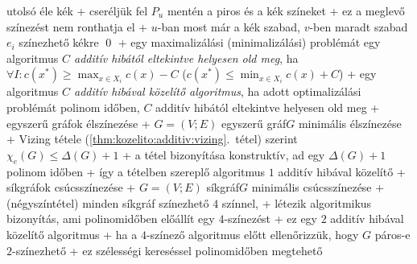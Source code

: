         utolsó éle kék
    + cseréljük fel $P_u$ mentén a piros és a kék színeket
      + ez a meglevő színezést nem ronthatja el
      + $u$-ban most már a kék szabad, $v$-ben maradt szabad \RA%
        $e_i$ színezhető kékre \qed
+ \dfn egy maximalizálási (minimalizálási) problémát egy algoritmus
  \emph{$C$ additív hibától eltekintve helyesen old meg}, ha $\forall I:
  c(x^*) \ge \max_{x \in X_i} c(x) - C$ ($c(x^*) \le \min_{x \in X_i}
  c(x) + C$)
+ \dfn egy algoritmus \emph{$C$ additív hibával közelítő algoritmus},
  ha adott optimalizálási problémát polinom időben, $C$ additív
  hibától eltekintve helyesen old meg
+ \prob egyszerű gráfok élszínezése
  + \DataIn $G = (V; E)$ egyszerű gráf\qquad\DataOut $G$
    minimális élszínezése
  + Vizing tétele (\ref{thm:kozelito:additiv:vizing}.~tétel) szerint
    $\chi_e(G) \le \Delta(G) + 1$
    + a tétel bizonyítása konstruktív, ad egy $\Delta(G) + 1$ polinom
      időben
    + így a tételben szereplő algoritmus $1$ additív hibával közelítő
+ \prob síkgráfok csúcsszínezése
  + \DataIn $G = (V; E)$ síkgráf\qquad\DataOut $G$
    minimális csúcsszínezése
  + \thm (négyszíntétel) minden síkgráf színezhető $4$ színnel,
    \noproof
    + létezik algoritmikus bizonyítás, ami polinomidőben előállít egy
      $4$-színezést
    + ez egy $2$ additív hibával közelítő algoritmus
  + ha a $4$-színező algoritmus előtt ellenőrizzük, hogy $G$ páros-e
    \RA $2$-színezhető
    + ez szélességi kereséssel polinomidőben megtehető



